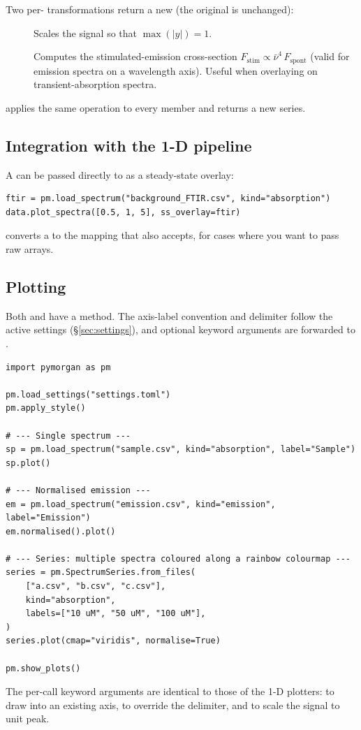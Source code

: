 Two per- transformations return a new 
(the original is unchanged):

\begin{description}
  \item[] Scales the signal so that
    $\max(|y|) = 1$.
  \item[] Computes the stimulated-emission
    cross-section $F_\text{stim} \propto \bar{\nu}^4 \, F_\text{spont}$ (valid
    for emission spectra on a wavelength axis). Useful when overlaying on
    transient-absorption spectra.
\end{description}

 applies the same operation to every member
and returns a new series.

\subsection{Integration with the 1-D pipeline}

A  can be passed directly to  as a
steady-state overlay:\

\begin{lstlisting}
ftir = pm.load_spectrum("background_FTIR.csv", kind="absorption")
data.plot_spectra([0.5, 1, 5], ss_overlay=ftir)
\end{lstlisting}

 converts a  to the
 mapping that  also accepts,
for cases where you want to pass raw arrays.

\subsection{Plotting}

Both  and  have a  method.
The axis-label convention and delimiter follow the active settings
(\S\ref{sec:settings}), and optional keyword arguments are forwarded to
.

\begin{lstlisting}
import pymorgan as pm

pm.load_settings("settings.toml")
pm.apply_style()

# --- Single spectrum ---
sp = pm.load_spectrum("sample.csv", kind="absorption", label="Sample")
sp.plot()

# --- Normalised emission ---
em = pm.load_spectrum("emission.csv", kind="emission", label="Emission")
em.normalised().plot()

# --- Series: multiple spectra coloured along a rainbow colourmap ---
series = pm.SpectrumSeries.from_files(
    ["a.csv", "b.csv", "c.csv"],
    kind="absorption",
    labels=["10 uM", "50 uM", "100 uM"],
)
series.plot(cmap="viridis", normalise=True)

pm.show_plots()
\end{lstlisting}

The per-call keyword arguments are identical to those of the 1-D plotters:
 to draw into an existing axis,  to override the
delimiter, and  to scale the signal to unit peak.

